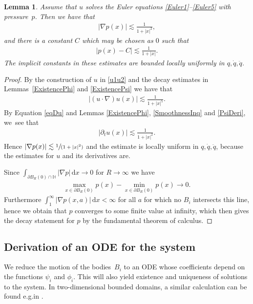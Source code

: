 \documentclass[10pt]{amsart}
\newcommand{\eg}{e.g.}
\newcommand{\spfrac}[2]{\sfrac{#1}{(#2)}}
\newtheorem{lemma}[theorem]{Lemma}
\theoremstyle{definition}
\newcommand\dd{\,\mathrm{d}}
\newcommand\dx{\dd x}
\let\de\partial
\begin{document}
\begin{lemma}\label{Decayp}
Assume that $u$ solves the Euler equations \eqref{Euler1}--\eqref{Euler5} with pressure~$p$.
Then we have that
\begin{align*}|\nabla p(x)|\lesssim \frac{1}{1+|x|^2},
\end{align*}
and there is a constant $C$ which may be chosen as $0$ such that
\begin{align*}|p(x)-C|\lesssim \frac{1}{1+|x|}.
\end{align*}
The implicit constants in these estimates are bounded locally uniformly in $q,\dot{q},\ddot{q}$.
\end{lemma}
\begin{proof}
By the construction of $u$ in \eqref{u1u2} and the decay estimates in Lem\-mas~\ref{ExistencePhi} and \ref{ExistencePsi} we have that
\begin{align*}
|(u\cdot\nabla)u(x)|\lesssim \frac{1}{1+|x|^5}.
\end{align*}
By Equation \eqref{eqDu} and Lemmas \ref{ExistencePhi}, \ref{SmoothnessInq} and \ref{PsiDeri}, we~see that
\begin{align*}
|\de_tu(x)|\lesssim \frac{1}{1+|x|^2}.
\end{align*}
Hence $|\nabla p(x)|\lesssim \spfrac{1}{1+|x|^2}$ and the estimate is locally uniform in $q,\dot{q},\ddot{q}$, because the estimates for $u$ and its derivatives are.

Since $\int_{\de B_R(0)\cap \mathbb{H}}|\nabla p|\dx\to 0$ for $R\to\infty$ we have
\begin{align*}
\max_{x\in \de B_R(0)} p(x)-\min_{x\in \de B_R(0)} p(x)\to 0.
\end{align*}
Furthermore $\int_1^\infty |\nabla p(x,a)|\dx<\infty$ for all $a$ for which no $B_i$ intersects this line, hence we obtain that $p$ converges to some finite value at infinity, which then gives the decay statement for $p$ by the fundamental theorem of calculus.
\end{proof}

\subsection{Derivation of an ODE for the system}
We reduce the motion of the bodies~$B_i$ to an ODE whose coefficients depend on the functions $\psi_i$ and $\phi_i$. This will also yield existence and uniqueness of solutions to the system.
In two-dimensional bounded domains, a similar calculation can be found \eg in \cite{GlassMunnierSueur2}.
\end{document}
